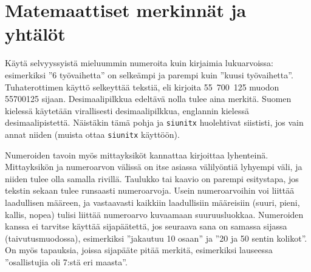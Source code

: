 \begin{table}
\centering
\caption{Esimerkki höyrystysolosuhteista kahdessa ohutkalvorakenteessa.}
\label{tab:taulukkoesimerkki}
\end{table}

\section{Matemaattiset merkinnät ja yhtälöt}

Käytä selvyyssyistä mieluummin numeroita kuin kirjaimia lukuarvoissa: esimerkiksi ''6 työvaihetta'' on selkeämpi ja parempi kuin ''kuusi työvaihetta''. Tuhaterottimen käyttö selkeyttää tekstiä, eli kirjoita 55~700~125 muodon 55700125 sijaan. Desimaalipilkkua edeltävä nolla tulee aina merkitä. Suomen kielessä käytetään virallisesti desimaalipilkkua, englannin kielessä desimaalipistettä. Näistäkin tämä pohja ja \texttt{siunitx} \parencite{siunitx} huolehtivat siististi, jos vain annat niiden (muista ottaa \texttt{siunitx} käyttöön).

Numeroiden tavoin myös mittayksiköt kannattaa kirjoittaa lyhenteinä. Mittayksikön ja numeroarvon välissä on itse asiassa välilyöntiä lyhyempi väli, ja niiden tulee olla samalla rivillä. Taulukko tai kaavio on parempi esitystapa, jos tekstin sekaan tulee runsaasti numeroarvoja. Usein numeroarvoihin voi liittää laadullisen määreen, ja vastaavasti kaikkiin laadullisiin määreisiin (suuri, pieni, kallis, nopea) tulisi liittää numeroarvo kuvaamaan suuruusluokkaa. Numeroiden kanssa ei tarvitse käyttää sijapäätettä, jos seuraava sana on samassa sijassa (taivutusmuodossa), esimerkiksi ''jakautuu 10 osaan'' ja ''20 ja 50 sentin kolikot''. On myös tapauksia, joissa sijapääte pitää merkitä, esimerkiksi lauseessa ''osallistujia oli 7:stä eri maasta''.

